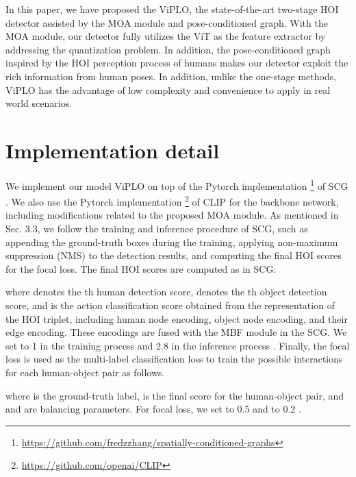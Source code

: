 \documentclass[10pt,twocolumn,letterpaper]{article}
\begin{document}
In this paper, we have proposed the ViPLO, the state-of-the-art two-stage HOI detector assisted by the MOA module and pose-conditioned graph. With the MOA module, our detector fully utilizes the ViT as the feature extractor by addressing the quantization problem. In addition, the pose-conditioned graph inspired by the HOI perception process of humans makes our detector exploit the rich information from human poses. In addition, unlike the one-stage methods, ViPLO has the advantage of low complexity and convenience to apply in real world scenarios.


{\small


}

\clearpage

\appendix



\section{Implementation detail}
\label{app:a}
We implement our model ViPLO on top of the Pytorch implementation \footnote{\url{https://github.com/fredzzhang/spatially-conditioned-graphs}} of SCG\cite{zhang2021spatially} . We also use the Pytorch implementation \footnote{\url{https://github.com/openai/CLIP}} of CLIP \cite{radford2021learning} for the backbone network, including modifications related to the proposed MOA module. As mentioned in Sec. 3.3, we follow the training and inference procedure of SCG, such as appending the ground-truth boxes during the training, applying non-maximum suppression (NMS) to the detection results, and computing the final HOI scores for the focal loss. The final HOI scores are computed as in SCG: 

where  denotes the th human detection score,  denotes the th object detection score, and  is the action classification score obtained from the representation of the HOI triplet, including human node encoding, object node encoding, and their edge encoding. These encodings are fused with the MBF module in the SCG. We set  to 1 in the training process and 2.8 in the inference process \cite{zhang2021spatially}.
Finally, the focal loss \cite{lin2017focal} is used as the multi-label classification loss to train the possible interactions for each human-object pair as follows.

where  is the ground-truth label,  is the final score for the human-object pair, and  and  are balancing parameters.
For focal loss, we set  to 0.5 and  to 0.2 \cite{zhang2021spatially}. 
\end{document}
